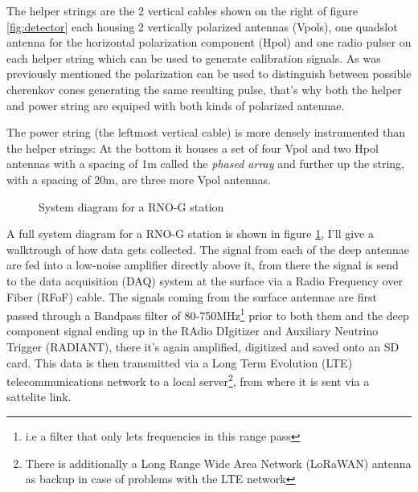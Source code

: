 \documentclass[11pt,a4paper,faculty=we,language=en,doctype=report]{cls/ugent-doc}
\begin{document}
The helper strings are the 2 vertical cables shown on the right of figure
\ref{fig:detector} each housing 2 vertically polarized antennas (Vpols), one
quadslot antenna for the horizontal polarization component (Hpol) and one radio
pulser on each helper string which can be used to generate calibration signals.
As was previously mentioned the polarization can be used to
distinguish between possible cherenkov cones generating the same resulting
pulse, that's why both the helper and power string are equiped with both kinds
of polarized antennae.

The power string (the leftmost vertical cable) is more densely instrumented
than the helper strings: At the bottom it houses a set of four Vpol and two
Hpol antennas with a spacing of 1m called the \textit{phased array} and further
up the string, with a spacing of 20m, are three more Vpol antennas.
\begin{figure}
  \centering
  \caption{System diagram for a RNO-G station}
  \label{fig:SysDiag}
\end{figure}

A full system diagram for a RNO-G station is shown in figure \ref{fig:SysDiag}, I'll
give a walktrough of how data gets collected.
The signal from each of the deep antennae are fed into a low-noise amplifier
directly above it, from there the signal is send to the data acquisition (DAQ)
system at the surface via a Radio Frequency over Fiber (RFoF) cable.  The
signals coming from the surface antennae are first passed through a Bandpass
filter of 80-750MHz\footnote{i.e a filter that only lets frequencies in this
range pass} prior to both them and the deep component signal ending up in the
RAdio DIgitizer and Auxiliary Neutrino Trigger (RADIANT), there it's again
amplified, digitized and saved onto an SD card. This data is then transmitted
via a Long Term Evolution (LTE) telecommunications network to a local
server\footnote{There is additionally a Long Range Wide Area Network (LoRaWAN)
antenna as backup in case of problems with the LTE network}, from where it is
sent via a sattelite link.
\end{document}
